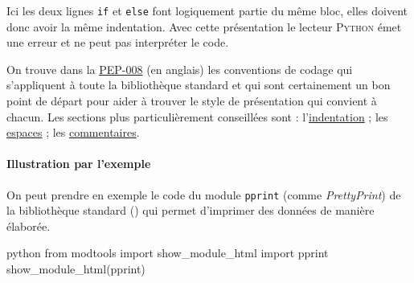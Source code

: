 Ici les deux lignes \texttt{if} et \texttt{else} font logiquement partie du même bloc, elles doivent donc avoir la même indentation. Avec cette présentation le lecteur \textsc{Python} émet une erreur et ne peut pas interpréter le code.


On trouve dans la \href{https://legacy.python.org/dev/peps/pep-0008/}{PEP-008} (en anglais) les conventions de codage qui s'appliquent à toute la bibliothèque standard et qui sont certainement un bon point de départ pour aider à trouver le style de présentation qui convient à chacun. Les sections plus particulièrement conseillées sont : l'\href{https://legacy.python.org/dev/peps/pep-0008/\#code-lay-out}{indentation} ; les \href{https://legacy.python.org/dev/peps/pep-0008/\#whitespace-in-expressions-and-statements}{espaces} ; les \href{https://legacy.python.org/dev/peps/pep-0008/\#comments}{commentaires}.

\paragraph*{Illustration par l'exemple}
On peut prendre en exemple le code du module \texttt{pprint} (comme \textit{PrettyPrint}) de la bibliothèque standard () qui permet d'imprimer des données de manière élaborée.

\begin{codebox}{python}
from modtools import show_module_html
import pprint
show_module_html(pprint)
\end{codebox}

